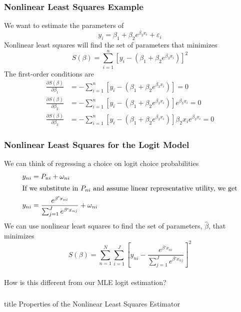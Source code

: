 \documentclass{beamer}
\begin{document}
\begin{frame}\frametitle{Nonlinear Least Squares Example}
	We want to estimate the parameters of
    $$y_i = \beta_1 + \beta_2 e^{\beta_3 x_i} + \varepsilon_i$$
    Nonlinear least squares will find the set of parameters that minimizes
    $$S(\beta) = \sum_{i = 1}^n [y_i - (\beta_1 + \beta_2 e^{\beta_3 x_i})]^2$$
    The first-order conditions are
    \begin{align*}
    	\frac{\partial S(\beta)}{\partial \beta_1} &= -\sum_{i = 1}^n [y_i - (\beta_1 + \beta_2 e^{\beta_3 x_i})] = 0 \\
    	\frac{\partial S(\beta)}{\partial \beta_2} &= -\sum_{i = 1}^n [y_i - (\beta_1 + \beta_2 e^{\beta_3 x_i})] e^{\beta_3 x_i} = 0 \\
    	\frac{\partial S(\beta)}{\partial \beta_3} &= -\sum_{i = 1}^n [y_i - (\beta_1 + \beta_2 e^{\beta_3 x_i})] \beta_2 x_i e^{\beta_3 x_i} = 0
    \end{align*}
\end{frame}

\begin{frame}\frametitle{Nonlinear Least Squares for the Logit Model}
    We can think of regressing a choice on logit choice probabilities
    \begin{align*}
    	y_{ni} &= P_{ni} + \omega_{ni} \\
    	\intertext{If we substitute in $P_{ni}$ and assume linear representative utility, we get}
    	y_{ni} &= \frac{e^{\beta' x_{ni}}}{\sum_{j = 1}^J e^{\beta' x_{nj}}} + \omega_{ni}
    \end{align*}
    We can use nonlinear least squares to find the set of parameters, $\hat{\beta}$, that minimizes
    $$S(\beta) = \sum_{n = 1}^N \sum_{i = 1}^J \left[ y_{ni} - \frac{e^{\beta' x_{ni}}}{\sum_{j = 1}^J e^{\beta' x_{nj}}} \right]^2$$ \\
    \vspace{2ex}
    How is this different from our MLE logit estimation?
\end{frame}

\begin{frame}\frametitle{}
    \vfill
    \centering
    \begin{beamercolorbox}[center]{title}
        \Large Properties of the Nonlinear Least Squares Estimator
    \end{beamercolorbox}
    \vfill
\end{frame}
\end{document}
